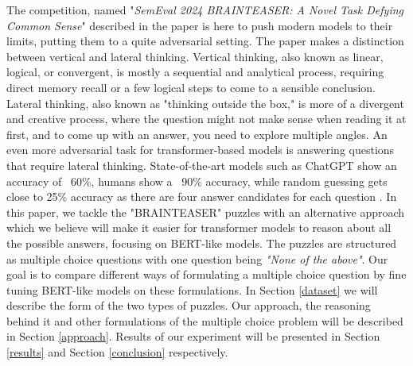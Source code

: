 The competition, named "\textit{SemEval 2024 BRAINTEASER: A Novel Task Defying Common Sense}" described in the paper \citep{semeval} is here to push modern models to their limits, putting
them to a quite adversarial setting.
The paper makes a distinction between vertical and lateral thinking.
Vertical thinking, also known as linear, logical, or convergent, is mostly a sequential and analytical process, requiring direct memory recall or a few logical steps to come to a sensible conclusion.
Lateral thinking, also known as "thinking outside the box," is more of a divergent and creative process, where the question might not make sense when reading it at first, and to come up with an answer, you need to explore multiple angles.
An even more adversarial task for transformer-based models is answering questions that require lateral thinking. State-of-the-art models such as ChatGPT show an accuracy of ~60\%, humans show a ~90\% accuracy, while random guessing gets close to 25\% accuracy as there are four answer candidates for each question \citep{semeval}.
In this paper, we tackle the "BRAINTEASER" puzzles with an alternative approach which we believe will make it easier for transformer models to reason about all the possible answers, focusing on BERT-like models.
The puzzles are structured as multiple choice questions with one question being \emph{"None of the above"}.
Our goal is to compare different ways of formulating a multiple choice question by fine tuning BERT-like models on these formulations.
In Section \ref{dataset} we will describe the form of the two types of puzzles. 
Our approach, the reasoning behind it and other formulations of the multiple choice problem will be described in Section \ref{approach}.
Results of our experiment will be presented in Section \ref{results} and Section \ref{conclusion} respectively.